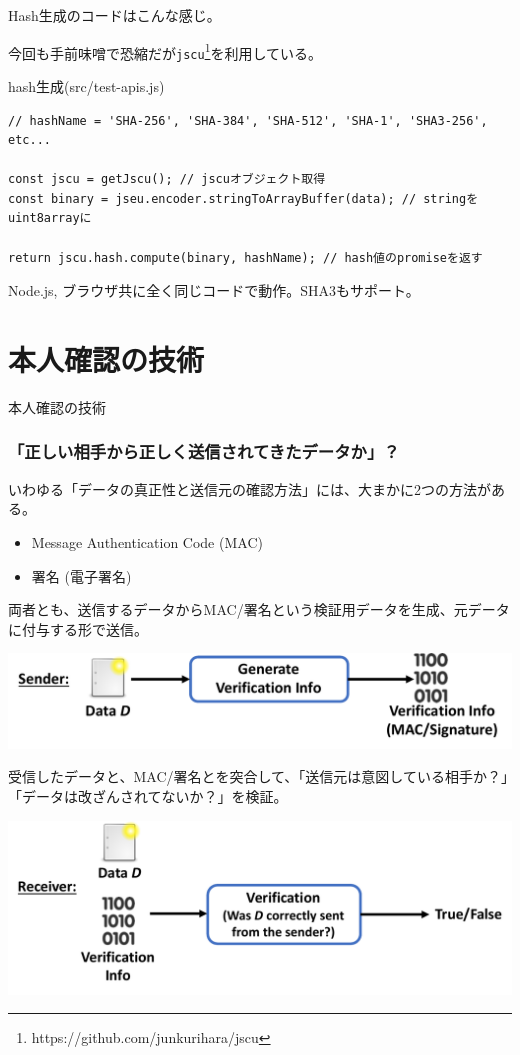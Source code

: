 \documentclass[12pt,dvipdfmx]{beamer}
\begin{document}
\begin{frame}[fragile]
Hash生成のコードはこんな感じ。

今回も手前味噌で恐縮だが\texttt{jscu}\footnote[frame]{https://github.com/junkurihara/jscu}を利用している。

\begin{block}{\small hash生成(src/test-apis.js)}
\scriptsize
\begin{verbatim}
// hashName = 'SHA-256', 'SHA-384', 'SHA-512', 'SHA-1', 'SHA3-256', etc...

const jscu = getJscu(); // jscuオブジェクト取得
const binary = jseu.encoder.stringToArrayBuffer(data); // stringをuint8arrayに

return jscu.hash.compute(binary, hashName); // hash値のpromiseを返す
\end{verbatim}
\end{block}
Node.js, ブラウザ共に全く同じコードで動作。SHA3もサポート。
\end{frame}
\section{本人確認の技術}
\begin{frame}
\centering
{\Large 本人確認の技術}
\end{frame}

\begin{frame}
\frametitle{「正しい相手から正しく送信されてきたデータか」？}
いわゆる「データの真正性と送信元の確認方法」には、大まかに2つの方法がある。
\begin{itemize}
 \item Message Authentication Code (MAC)
 \item 署名 (電子署名)
\end{itemize}

\end{frame}

\begin{frame}
両者とも、送信するデータからMAC/署名という検証用データを生成、元データに付与する形で送信。
\begin{center}
 \includegraphics[width=0.75\linewidth]{Figs/mac-sig-flow01.pdf}
\end{center}
受信したデータと、MAC/署名とを突合して、「送信元は意図している相手か？」「データは改ざんされてないか？」を検証。
\begin{center}
 \includegraphics[width=0.75\linewidth]{Figs/mac-sig-flow02.pdf}
\end{center}
\end{frame}
\end{document}
